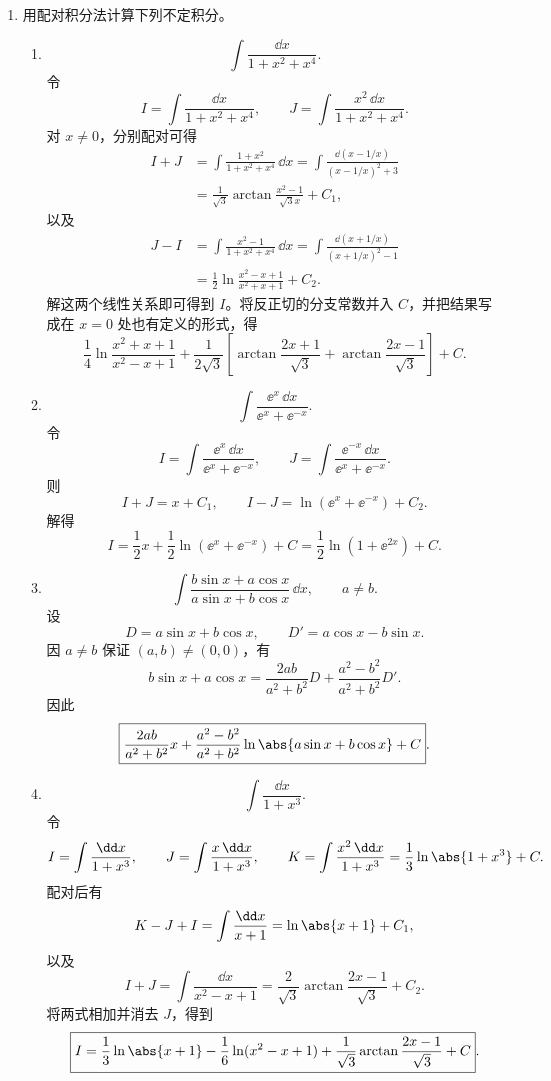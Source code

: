 \begin{enumerate}
  \item 用配对积分法计算下列不定积分。
  \begin{enumerate}[label=(\arabic*)]
    \item
    \[
      \int\frac{\dd x}{1+x^2+x^4}.
    \]
    令
    \[
      I=\int\frac{\dd x}{1+x^2+x^4},
      \qquad
      J=\int\frac{x^2\,\dd x}{1+x^2+x^4}.
    \]
    对 $x\ne0$，分别配对可得
    \begin{align*}
      I+J
      &=\int\frac{1+x^2}{1+x^2+x^4}\,\dd x
       =\int\frac{\dd(x-1/x)}{(x-1/x)^2+3}\\
      &=\frac1{\sqrt3}\arctan\frac{x^2-1}{\sqrt3x}+C_1,
    \end{align*}
    以及
    \begin{align*}
      J-I
      &=\int\frac{x^2-1}{1+x^2+x^4}\,\dd x
       =\int\frac{\dd(x+1/x)}{(x+1/x)^2-1}\\
      &=\frac12\ln\frac{x^2-x+1}{x^2+x+1}+C_2.
    \end{align*}
    解这两个线性关系即可得到 $I$。将反正切的分支常数并入 $C$，并把结果写成在 $x=0$ 处也有定义的形式，得
    \[
      \boxed{
      \frac14\ln\frac{x^2+x+1}{x^2-x+1}
      +\frac1{2\sqrt3}\left[
        \arctan\frac{2x+1}{\sqrt3}
        +\arctan\frac{2x-1}{\sqrt3}
      \right]+C}.
    \]

    \item
    \[
      \int\frac{\ee^x\,\dd x}{\ee^x+\ee^{-x}}.
    \]
    令
    \[
      I=\int\frac{\ee^x\,\dd x}{\ee^x+\ee^{-x}},
      \qquad
      J=\int\frac{\ee^{-x}\,\dd x}{\ee^x+\ee^{-x}}.
    \]
    则
    \[
      I+J=x+C_1,
      \qquad
      I-J=\ln(\ee^x+\ee^{-x})+C_2.
    \]
    解得
    \[
      \boxed{I=\frac12x+\frac12\ln(\ee^x+\ee^{-x})+C}
      =\frac12\ln(1+\ee^{2x})+C.
    \]

    \item
    \[
      \int\frac{b\sin x+a\cos x}{a\sin x+b\cos x}\,\dd x,
      \qquad a\ne b.
    \]
    设
    \[
      D=a\sin x+b\cos x,
      \qquad
      D'=a\cos x-b\sin x.
    \]
    因 $a\ne b$ 保证 $(a,b)\ne(0,0)$，有
    \[
      b\sin x+a\cos x
      =\frac{2ab}{a^2+b^2}D
       +\frac{a^2-b^2}{a^2+b^2}D'.
    \]
    因此
    \[
      \boxed{
      \frac{2ab}{a^2+b^2}x
      +\frac{a^2-b^2}{a^2+b^2}\ln\abs{a\sin x+b\cos x}+C}.
    \]

    \item
    \[
      \int\frac{\dd x}{1+x^3}.
    \]
    令
    \[
      I=\int\frac{\dd x}{1+x^3},
      \qquad
      J=\int\frac{x\,\dd x}{1+x^3},
      \qquad
      K=\int\frac{x^2\,\dd x}{1+x^3}
       =\frac13\ln\abs{1+x^3}+C.
    \]
    配对后有
    \[
      K-J+I=\int\frac{\dd x}{x+1}=\ln\abs{x+1}+C_1,
    \]
    以及
    \[
      I+J=\int\frac{\dd x}{x^2-x+1}
      =\frac2{\sqrt3}\arctan\frac{2x-1}{\sqrt3}+C_2.
    \]
    将两式相加并消去 $J$，得到
    \[
      \boxed{
      I=\frac13\ln\abs{x+1}
      -\frac16\ln(x^2-x+1)
      +\frac1{\sqrt3}\arctan\frac{2x-1}{\sqrt3}+C}.
    \]
  \end{enumerate}


\end{enumerate}
